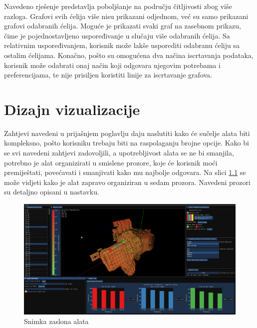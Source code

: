 \documentclass[times, utf8, diplomski]{fer}
\begin{document}
Navedeno rješenje predstavlja poboljšanje na području čitljivosti zbog više razloga. Grafovi svih ćelija više nisu prikazani odjednom, već su samo prikazani grafovi odabranih ćelija. Moguće je prikazati svaki graf na zasebnom prikazu, čime je pojednostavljeno uspoređivanje u slučaju više odabranih ćelija. Sa relativnim uspoređivanjem, korisnik može lakše usporediti odabranu ćeliju sa ostalim ćelijama. Konačno, pošto su omogućena dva načina iscrtavanja podataka, korisnik može odabrati onaj način koji odgovara njegovim potrebama i preferencijama, te nije prisiljen koristiti linije za iscrtavanje grafova.

\chapter{Dizajn vizualizacije}

Zahtjevi navedeni u prijašnjem poglavlju daju naslutiti kako će sučelje alata biti kompleksno, pošto korisniku trebaju biti na raspolaganju brojne opcije. Kako bi se svi navedeni zahtjevi zadovoljili, a upotrebljivost alata se ne bi smanjila, potrebno je alat organizirati u smislene prozore, koje će korisnik moći premiještati, povećavati i smanjivati kako mu najbolje odgovara. Na slici \ref{fig:gen-screen} se može vidjeti kako je alat zapravo organiziran u sedam prozora. Navedeni prozori su detaljno opisani u nastavku.\\

\begin{figure}[H]
\centering
\includegraphics[width=\linewidth]{general_screenshot.png}
\caption{Snimka zaslona alata}
\label{fig:gen-screen}
\end{figure}
\end{document}
